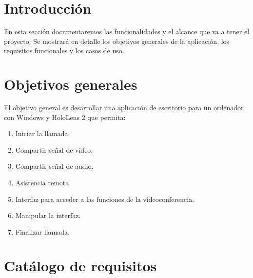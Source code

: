 
\section{Introducción}
En esta sección documentaremos las funcionalidades y el alcance que va a tener el proyecto. Se mostrará en detalle los objetivos generales de la aplicación, los requisitos funcionales y los casos de uso.
\section{Objetivos generales}
El objetivo general es desarrollar una aplicación de escritorio para un ordenador con Windows y HoloLens 2 que permita:
\begin{enumerate}
    \item Iniciar la llamada.
    \item Compartir señal de vídeo.
    \item Compartir señal de audio.
    \item Asistencia remota.
    \item Interfaz para acceder a las funciones de la videoconferencia.
    \item Manipular la interfaz.
    \item Finalizar llamada.
\end{enumerate}

\section{Catálogo de requisitos}

